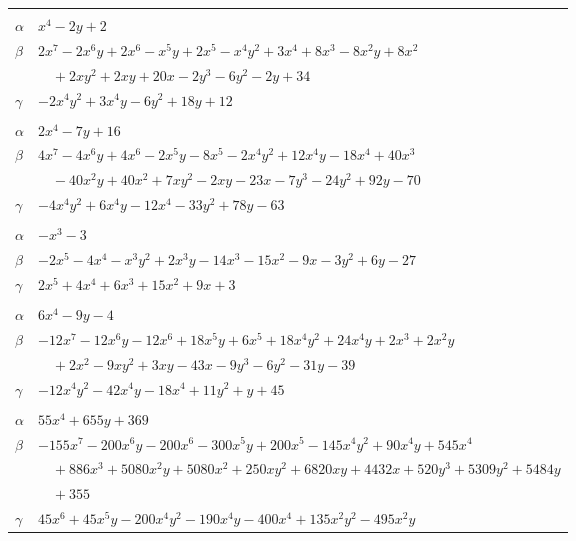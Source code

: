 \documentclass[11pt]{article}
\begin{document}
\begin{longtable}{@{}ll@{}}
\addlinespace[3pt]
\multicolumn{2}{@{}l}{$\{i,j\}=\{7,21\}$, $k_{ij}=2^{4}\cdot 3$}\\
$\alpha$ & $x^{4}-2y+2$\\
$\beta$ & $2x^{7}-2x^{6}y+2x^{6}-x^{5}y+2x^{5}-x^{4}y^{2}+3x^{4}+8x^{3}-8x^{2}y+8x^{2}$\\
 & $\quad +2xy^{2}+2xy+20x-2y^{3}-6y^{2}-2y+34$\\
$\gamma$ & $-2x^{4}y^{2}+3x^{4}y-6y^{2}+18y+12$\\
\addlinespace[3pt]
\multicolumn{2}{@{}l}{$\{i,j\}=\{7,26\}$, $k_{ij}=2^{3}\cdot 3^{2}$}\\
$\alpha$ & $2x^{4}-7y+16$\\
$\beta$ & $4x^{7}-4x^{6}y+4x^{6}-2x^{5}y-8x^{5}-2x^{4}y^{2}+12x^{4}y-18x^{4}+40x^{3}$\\
 & $\quad -40x^{2}y+40x^{2}+7xy^{2}-2xy-23x-7y^{3}-24y^{2}+92y-70$\\
$\gamma$ & $-4x^{4}y^{2}+6x^{4}y-12x^{4}-33y^{2}+78y-63$\\
\addlinespace[3pt]
\multicolumn{2}{@{}l}{$\{i,j\}=\{8,29\}$, $k_{ij}=2^{4}\cdot 3$}\\
$\alpha$ & $-x^{3}-3$\\
$\beta$ & $-2x^{5}-4x^{4}-x^{3}y^{2}+2x^{3}y-14x^{3}-15x^{2}-9x-3y^{2}+6y-27$\\
$\gamma$ & $2x^{5}+4x^{4}+6x^{3}+15x^{2}+9x+3$\\
\addlinespace[3pt]
\multicolumn{2}{@{}l}{$\{i,j\}=\{9,14\}$, $k_{ij}=5\cdot 7$}\\
$\alpha$ & $6x^{4}-9y-4$\\
$\beta$ & $-12x^{7}-12x^{6}y-12x^{6}+18x^{5}y+6x^{5}+18x^{4}y^{2}+24x^{4}y+2x^{3}+2x^{2}y$\\
 & $\quad +2x^{2}-9xy^{2}+3xy-43x-9y^{3}-6y^{2}-31y-39$\\
$\gamma$ & $-12x^{4}y^{2}-42x^{4}y-18x^{4}+11y^{2}+y+45$\\
\addlinespace[3pt]
\multicolumn{2}{@{}l}{$\{i,j\}=\{9,16\}$, $k_{ij}=2\cdot 7$}\\
$\alpha$ & $55x^{4}+655y+369$\\
$\beta$ & $-155x^{7}-200x^{6}y-200x^{6}-300x^{5}y+200x^{5}-145x^{4}y^{2}+90x^{4}y+545x^{4}$\\
 & $\quad +886x^{3}+5080x^{2}y+5080x^{2}+250xy^{2}+6820xy+4432x+520y^{3}+5309y^{2}+5484y$\\
 & $\quad +355$\\
$\gamma$ & $45x^{6}+45x^{5}y-200x^{4}y^{2}-190x^{4}y-400x^{4}+135x^{2}y^{2}-495x^{2}y$\\

\end{longtable}
\end{document}
